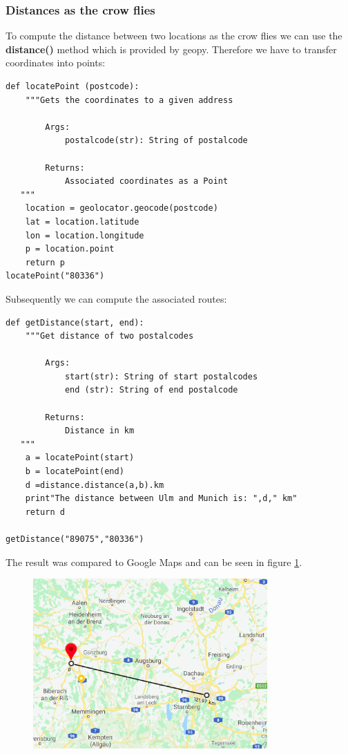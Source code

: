 \subsubsection{Distances as the crow flies}
To compute the distance between two locations as the crow flies we can use the \textbf{distance()} method which is provided by geopy.  Therefore we have to transfer coordinates into points:
\begin{lstlisting}[breaklines=true]
def locatePoint (postcode):
    """Gets the coordinates to a given address
        
        Args: 
            postalcode(str): String of postalcode
	        
        Returns: 
            Associated coordinates as a Point
   """
    location = geolocator.geocode(postcode)
    lat = location.latitude
    lon = location.longitude
    p = location.point
    return p
locatePoint("80336")
\end{lstlisting}
Subsequently we can compute the associated routes:
\begin{lstlisting}[breaklines=true]
def getDistance(start, end):
    """Get distance of two postalcodes
        
        Args: 
            start(str): String of start postalcodes
            end (str): String of end postalcode
	        
        Returns: 
            Distance in km 
   """
    a = locatePoint(start)
    b = locatePoint(end)
    d =distance.distance(a,b).km
    print"The distance between Ulm and Munich is: ",d," km"
    return d
    
getDistance("89075","80336")
\end{lstlisting}
The result was compared to Google Maps and can be seen in figure \ref{fig:fly}.
\begin{figure}[H]
\hspace{1.3cm}
\includegraphics[width=0.8\textwidth]{img/fly}
\label{fig:fly}
\end{figure}
